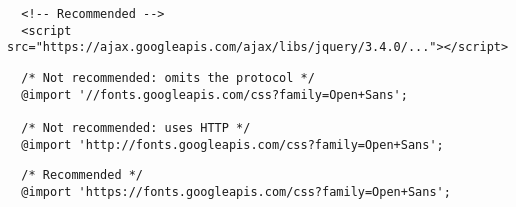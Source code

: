 \documentclass[oneside, UTF8, fontset = adobe]{ctexart}
\begin{document}
\begin{tcolorbox}[
  colback=white,
  coltext=ForestGreen,
  colframe=LightGray,
  boxrule=0.5mm
  ]
  \begin{verbatim}
  <!-- Recommended -->
  <script src="https://ajax.googleapis.com/ajax/libs/jquery/3.4.0/..."></script>\end{verbatim}
\end{tcolorbox}

\begin{tcolorbox}[
  colback=MistyRose,
  coltext=red,
  colframe=LightGray,
  boxrule=0.5mm
  ]
  \begin{verbatim}
  /* Not recommended: omits the protocol */
  @import '//fonts.googleapis.com/css?family=Open+Sans';

  /* Not recommended: uses HTTP */
  @import 'http://fonts.googleapis.com/css?family=Open+Sans';\end{verbatim}
\end{tcolorbox}

\begin{tcolorbox}[
  colback=white,
  coltext=ForestGreen,
  colframe=LightGray,
  boxrule=0.5mm
  ]
  \begin{verbatim}
  /* Recommended */
  @import 'https://fonts.googleapis.com/css?family=Open+Sans';\end{verbatim}
\end{tcolorbox}
\end{document}
